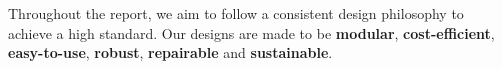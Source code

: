 



Throughout the report, we aim to follow a consistent design philosophy to achieve a high standard. Our designs are made to be \textbf{modular}, \textbf{cost-efficient}, \textbf{easy-to-use}, \textbf{robust}, \textbf{repairable} and \textbf{sustainable}.

